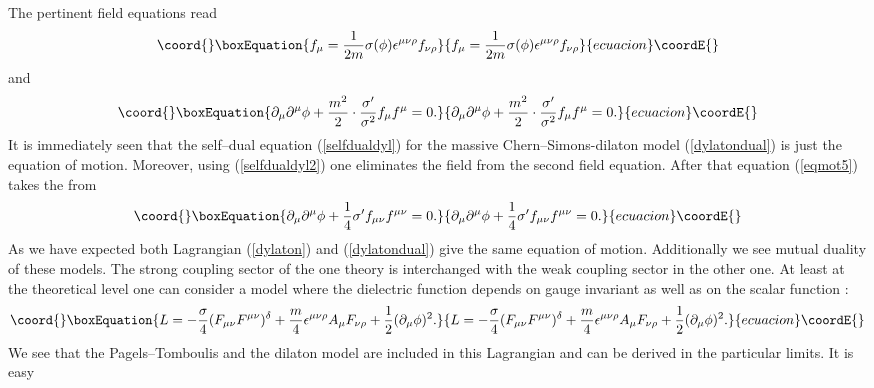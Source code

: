 \documentclass[a4 paper, 12 pt] {article}
\begin{document}
The pertinent field equations read
\begin{equation}\coord{}\boxEquation{
f_{\mu } = \frac{1}{2 m } \sigma (\phi ) \epsilon^{\mu \nu \rho } f_{\nu
\rho }
\label{selfdualdyl2}
}{
f_{\mu } = \frac{1}{2 m } \sigma (\phi ) \epsilon^{\mu \nu \rho } f_{\nu
\rho }
}{ecuacion}\coordE{}\end{equation}
and
\begin{equation}\coord{}\boxEquation{
\partial_{\mu } \partial^{\mu } \phi + \frac{m^2}{2} \cdot
\frac{\sigma'}{\sigma^2} f_{\mu } f^{\mu }=0.
\label{eqmot5}
}{
\partial_{\mu } \partial^{\mu } \phi + \frac{m^2}{2} \cdot
\frac{\sigma'}{\sigma^2} f_{\mu } f^{\mu }=0.
}{ecuacion}\coordE{}\end{equation}
It is immediately seen that the self--dual equation (\ref{selfdualdyl})
for the massive Chern--Simons-dilaton model (\ref{dylatondual}) is just the
equation of motion. Moreover, using (\ref{selfdualdyl2}) one eliminates the
field \coordHE{} from the second field equation. After that equation
(\ref{eqmot5}) takes the from
\begin{equation}\coord{}\boxEquation{
\partial_{\mu } \partial^{\mu } \phi +\frac{1}{4} \sigma' f_{\mu \nu } f^{\mu \nu
}=0.
\label{eqmot6}
}{
\partial_{\mu } \partial^{\mu } \phi +\frac{1}{4} \sigma' f_{\mu \nu } f^{\mu \nu
}=0.
}{ecuacion}\coordE{}\end{equation}
As we have expected both Lagrangian (\ref{dylaton}) and
(\ref{dylatondual}) give the same equation of motion. Additionally we see
mutual duality of these models. The strong coupling sector of the one
theory is interchanged with the weak coupling sector in the other one.
\newline
At least at the theoretical level one can consider a model where the
dielectric function depends on \coordHE{} gauge invariant \coordHE{} as well as on the scalar function \myHighlight{$\phi $}\coordHE{}:
\begin{equation}\coord{}\boxEquation{
L= -\frac{\sigma}{4} (F_{\mu \nu }F^{\mu \nu } )^{\delta} +\frac{m}{4}
\epsilon^{\mu \nu \rho } A_{\mu } F_{\nu \rho } +\frac{1}{2} (\partial_{\mu } \phi
)^2.
\label{massivedyl}
}{
L= -\frac{\sigma}{4} (F_{\mu \nu }F^{\mu \nu } )^{\delta} +\frac{m}{4}
\epsilon^{\mu \nu \rho } A_{\mu } F_{\nu \rho } +\frac{1}{2} (\partial_{\mu } \phi
)^2.
}{ecuacion}\coordE{}\end{equation}
We see that the Pagels--Tomboulis and the dilaton model are included in
this Lagrangian and can be derived in the particular limits. It is easy
\end{document}
